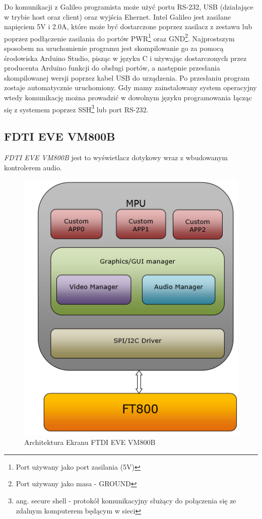 \documentclass{xmgr}
\begin{document}
Do komunikacji z Galileo programista może użyć portu RS-232, USB (działające w trybie host oraz client) oraz wyjścia Ehernet. Intel Galileo jest zasilane napięciem 5V i 2.0A, które może być dostarczone poprzez zasilacz z zestawu lub poprzez podłączenie zasilania do portów PWR\footnote{Port używany jako port zasilania (5V)} oraz GND\footnote{Port używany jako masa - GROUND}. Najprostszym sposobem na uruchomienie programu jest skompilowanie go za pomocą środowiska Arduino Studio, pisząc w języku C i używając dostarczonych przez producenta Arduino funkcji do obsługi portów, a następnie przesłania skompilowanej wersji poprzez kabel USB do urządzenia. Po przesłaniu program zostaje automatycznie uruchomiony. Gdy mamy zainstalowany system operacyjny wtedy komunikację można prowadzić w dowolnym języku programowania łącząc się z systemem poprzez SSH\footnote{ang. secure shell - protokół komunikacyjny służący do połączenia się ze zdalnym komputerem będącym w sieci} lub port RS-232.

\subsection{FDTI EVE VM800B}
\emph{FDTI EVE VM800B} jest to wyświetlacz dotykowy wraz z wbudowanym kontrolerem audio. 
\begin{figure}[!h]
    \centering
    \includegraphics[height=0.4\textheight]{images/FTDIarchitecture.png}
    \caption{Architektura Ekranu FTDI EVE VM800B}
\end{figure}
\end{document}
